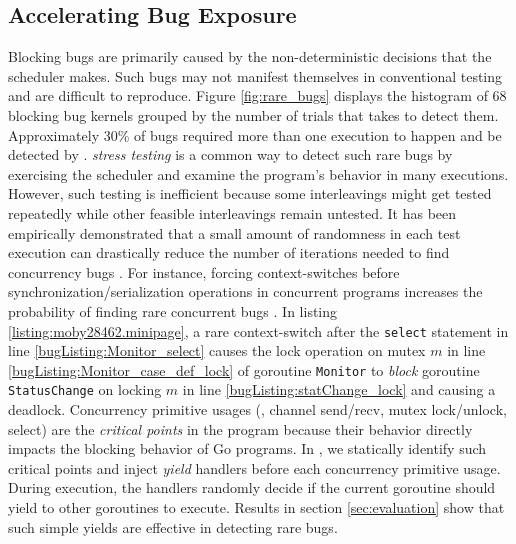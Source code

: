 \subsection{Accelerating Bug Exposure}
Blocking bugs are primarily caused by the non-deterministic decisions that the scheduler makes.
%
Such bugs may not manifest themselves in conventional testing and are difficult to reproduce.
%
Figure \ref{fig:rare_bugs} displays the histogram of 68 blocking bug kernels grouped by the number of trials that \goat takes to detect them.
%
Approximately 30\% of bugs required more than one execution to happen and be detected by \goat.
%
\textit{stress testing} is a common way to detect such rare bugs by exercising the scheduler and examine the program's behavior in many executions.
%
However, such testing is inefficient because some interleavings might get tested repeatedly while other feasible interleavings remain untested.
%
It has been empirically demonstrated that a small amount of randomness in each test execution can drastically reduce the number of iterations needed to find concurrency bugs \cite{thomson-concurrencyTesting-ppopp14,emmi-delayBounded-popl11}.
%
For instance, forcing context-switches before synchronization/serialization operations in concurrent programs increases the probability of finding rare concurrent bugs \cite{burckhardt-depthBug-asplos10}.
%
In listing \ref{listing:moby28462.minipage}, a rare context-switch after the \texttt{select} statement in line \ref{bugListing:Monitor_select} causes the lock operation on mutex $m$ in line \ref{bugListing:Monitor_case_def_lock} of goroutine \texttt{Monitor} to \textit{block} goroutine \texttt{StatusChange} on locking $m$ in line \ref{bugListing:statChange_lock} and causing a deadlock.
%
Concurrency primitive usages (\eg, channel send/recv, mutex lock/unlock, select) are the \textit{critical points} in the program because their behavior directly impacts the blocking behavior of Go programs.
%
In \goat, we statically identify such critical points and inject \textit{yield} handlers before each concurrency primitive usage.
%
During execution, the handlers randomly decide if the current goroutine should yield to other goroutines to execute.
%
Results in section \ref{sec:evaluation} show that such simple yields are effective in detecting rare bugs.

